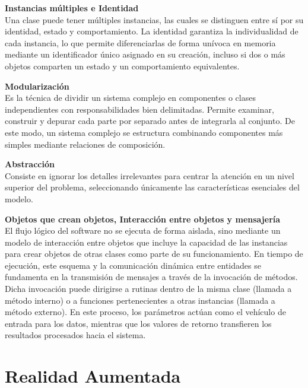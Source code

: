 \noindent\textbf{Instancias múltiples e Identidad} \vspace{0.5em} \\ 
\indent Una clase puede tener múltiples instancias, las cuales se distinguen 
entre sí por su identidad, estado y comportamiento. La identidad garantiza la 
individualidad de cada instancia, lo que permite diferenciarlas de forma 
unívoca en memoria mediante un identificador único asignado en su creación, 
incluso si dos o más objetos comparten un estado y un comportamiento 
equivalentes.
\vspace{1.5em}

\noindent\textbf{Modularización} \vspace{0.5em} \\ 
\indent Es la técnica de dividir un sistema complejo en componentes o clases 
independientes con responsabilidades bien delimitadas. Permite examinar, 
construir y depurar cada parte por separado antes de integrarla al conjunto. 
De este modo, un sistema complejo se estructura combinando componentes más 
simples mediante relaciones de composición.
\vspace{1.5em}

\noindent\textbf{Abstracción} \vspace{0.5em} \\ 
\indent Consiste en ignorar los detalles irrelevantes para centrar la atención 
en un nivel superior del problema, seleccionando únicamente las características 
esenciales del modelo.\vspace{1.5em}

\noindent\textbf{Objetos que crean objetos, Interacción entre objetos y mensajería} \vspace{0.5em} \\ 
\indent El flujo lógico del software no se ejecuta de forma aislada, sino 
mediante un modelo de interacción entre objetos que incluye la capacidad de las 
instancias para crear objetos de otras clases como parte de su funcionamiento. 
En tiempo de ejecución, este esquema y la comunicación dinámica entre entidades 
se fundamenta en la transmisión de mensajes a través de la invocación de 
métodos. Dicha invocación puede dirigirse a rutinas dentro de la misma clase 
(llamada a método interno) o a funciones pertenecientes a otras instancias 
(llamada a método externo). En este proceso, los parámetros actúan como el 
vehículo de entrada para los datos, mientras que los valores de retorno 
transfieren los resultados procesados hacia el sistema.

\section{Realidad Aumentada}

